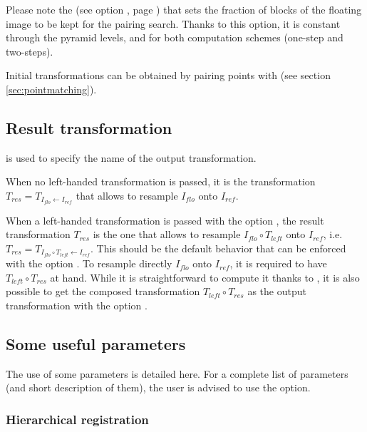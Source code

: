 \begin{itemize}
\begin{note}
Please note the  (see option
, page
\pageref{opt:floating:selection:fraction}) that sets the fraction of
blocks of the floating image to be kept for the pairing search. Thanks
to this option, it is constant through the pyramid levels, and for
both computation schemes (one-step and two-steps).
\end{note}

\end{itemize}

Initial transformations can be obtained by pairing points with \pointmatching (see section \ref{sec:pointmatching}).



\subsection{Result transformation}

 is used to specify the name of
the output transformation.

When no left-handed transformation is passed, it is the transformation $T_{res} = T_{I_{flo} \leftarrow
  I_{ref}}$ that allows to resample $I_{flo}$ onto $I_{ref}$.

When a left-handed transformation is passed with the option
, the result transformation $T_{res}$ is
the one that allows to resample  $I_{flo} \circ T_{left}$ onto
$I_{ref}$, i.e. $T_{res} = T_{I_{flo} \circ T_{left} \leftarrow
  I_{ref}}$. 
%
This should be the default behavior that can
be enforced with the option .
%
To resample directly $I_{flo}$ onto $I_{ref}$, it is required to have
$T_{left} \circ T_{res}$ at hand. While it is straightforward to
compute it thanks to \composeTrsf, it is also possible to get the
composed transformation $T_{left} \circ T_{res}$ as the output
transformation with the option .


\subsection{Some useful parameters}

The use of some parameters is detailed here. For a complete list of parameters (and short description of them), the user is advised to use the  option.

\subsubsection{Hierarchical registration}
\label{sec:parameters:hierarchical}

